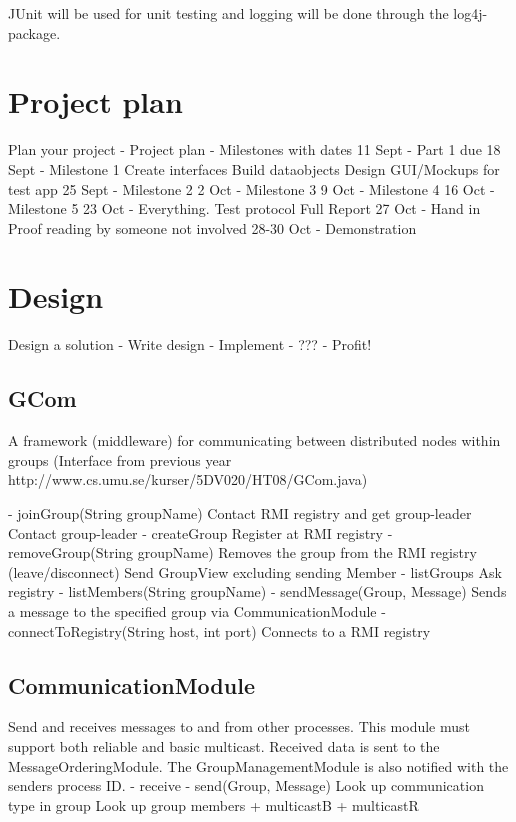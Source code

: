 \documentclass[11pt,swedish]{article}
\begin{document}
JUnit will be used for unit testing and logging will be done through the log4j-package. 

\section{Project plan}
Plan your project
- Project plan
- Milestones with dates
	11 Sept		- Part 1 due
	18 Sept		- Milestone 1
					Create interfaces
					Build dataobjects
					Design GUI/Mockups for test app
	25 Sept		- Milestone 2
	2 Oct		- Milestone 3
	9 Oct		- Milestone 4
	16 Oct		- Milestone 5
	23 Oct		- Everything.
		Test protocol
		Full Report
	27 Oct 		- Hand in
		Proof reading by someone not involved
	28-30 Oct 	- Demonstration

\section{Design}
Design a solution
- Write design
- Implement
- ???
- Profit!


\subsection{GCom}
A framework (middleware) for communicating between distributed nodes within groups
	(Interface from previous year http://www.cs.umu.se/kurser/5DV020/HT08/GCom.java)

- joinGroup(String groupName)
	Contact RMI registry and get group-leader
	Contact group-leader
- createGroup
	Register at RMI registry
- removeGroup(String groupName)
	Removes the group from the RMI registry
(leave/disconnect)
	Send GroupView excluding sending Member
- listGroups
	Ask registry
- listMembers(String groupName)
- sendMessage(Group, Message)
	Sends a message to the specified group via CommunicationModule
- connectToRegistry(String host, int port)
	Connects to a RMI registry


\subsection{CommunicationModule}
Send and receives messages to and from other processes. This module must support both reliable and basic multicast. Received data is sent to the MessageOrderingModule. The GroupManagementModule is also notified with the senders process ID. 
- receive
- send(Group, Message)
	Look up communication type in group
	Look up group members
+ multicastB
+ multicastR
\end{document}
